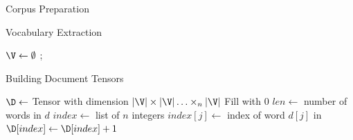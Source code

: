\documentclass[handout]{beamer}
\begin{document}
\begin{frame}{Corpus Preparation}
\begin{algorithm}[H]
  \caption{Prepare}
  \label{alg:Prepare}
  \BlankLine
\end{algorithm}
\end{frame}


\begin{frame}{Vocabulary Extraction}
\begin{algorithm}[H]
  \caption{Build Vocabulary}
  \label{alg:vocabulary}
  \Output{\V}
  \BlankLine
  $\V\leftarrow\emptyset$\;
  \Return{\V};
\end{algorithm}
\end{frame}


\begin{frame}{Building Document Tensors}
  \small
\begin{algorithm}[H]
  \caption{Build Tensor}
  \label{alg:BuildTensor}
    
  
  \Output{\D}
  \BlankLine
  $\D \leftarrow $ Tensor with dimension $|\V| \times |\V| \ldots
  \times_n |\V|$\;
  Fill \D with 0\;
  $len \leftarrow$ number of words in $d$\;
   {
    $index \leftarrow$ list of $n$ integers\;
     {
      $index[j] \leftarrow$ index of word $d[j]$ in \V\;
    }
    $\D[index] \leftarrow \D[index] + 1$\;
  }
  \Return{\D}
\end{algorithm}
\end{frame}
\end{document}
